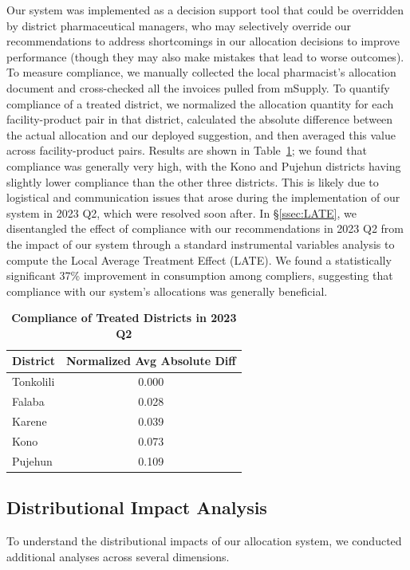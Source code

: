 \documentclass[12pt]{article}
\begin{document}
Our system was implemented as a decision support tool that could be overridden by district pharmaceutical managers, who may selectively override our recommendations to address shortcomings in our allocation decisions to improve performance (though they may also make mistakes that lead to worse outcomes). To measure compliance, we manually collected the local pharmacist's allocation document and cross-checked all the invoices pulled from mSupply. To quantify compliance of a treated district, we normalized the allocation quantity for each facility-product pair in that district, calculated the absolute difference between the actual allocation and our deployed suggestion, and then averaged this value across facility-product pairs. Results are shown in Table~\ref{tab:compliance}; we found that compliance was generally very high, with the Kono and Pujehun districts having slightly lower compliance than the other three districts. This is likely due to logistical and communication issues that arose during the implementation of our system in 2023 Q2, which were resolved soon after. In \S\ref{ssec:LATE}, we disentangled the effect of compliance with our recommendations in 2023 Q2 from the impact of our system through a standard instrumental variables analysis to compute the Local Average Treatment Effect (LATE). We found a statistically significant 37\% improvement in consumption among compliers, suggesting that compliance with our system's allocations was generally beneficial.

\begin{table}[t]
\centering
\caption{\textbf{Compliance of Treated Districts in 2023 Q2}}
\begin{tabular}{lc}
\toprule
District & Normalized Avg Absolute Diff \\
\midrule
Tonkolili & 0.000 \\
Falaba    & 0.028 \\
Karene    & 0.039 \\
Kono      & 0.073 \\
Pujehun   & 0.109 \\
\bottomrule
\end{tabular}
\label{tab:compliance}
\end{table}


\subsection{Distributional Impact Analysis}
\label{sup:heteroanalysis}

To understand the distributional impacts of our allocation system, we conducted additional analyses across several dimensions.
\end{document}
